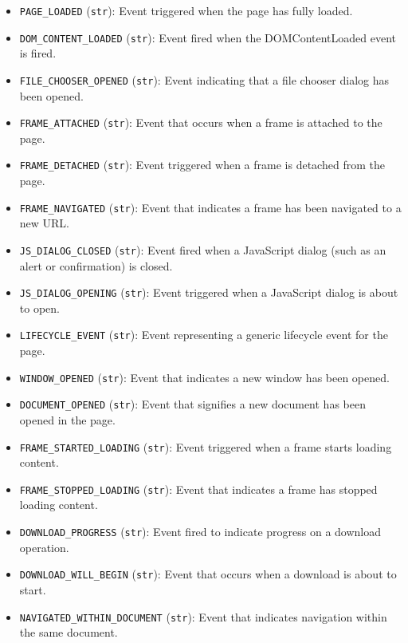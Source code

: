 \documentclass{article}
\begin{document}
\begin{itemize}
    \item \texttt{PAGE\_LOADED} (\texttt{str}): Event triggered when the page has fully loaded.
    \item \texttt{DOM\_CONTENT\_LOADED} (\texttt{str}): Event fired when the DOMContentLoaded event is fired.
    \item \texttt{FILE\_CHOOSER\_OPENED} (\texttt{str}): Event indicating that a file chooser dialog has been opened.
    \item \texttt{FRAME\_ATTACHED} (\texttt{str}): Event that occurs when a frame is attached to the page.
    \item \texttt{FRAME\_DETACHED} (\texttt{str}): Event triggered when a frame is detached from the page.
    \item \texttt{FRAME\_NAVIGATED} (\texttt{str}): Event that indicates a frame has been navigated to a new URL.
    \item \texttt{JS\_DIALOG\_CLOSED} (\texttt{str}): Event fired when a JavaScript dialog (such as an alert or confirmation) is closed.
    \item \texttt{JS\_DIALOG\_OPENING} (\texttt{str}): Event triggered when a JavaScript dialog is about to open.
    \item \texttt{LIFECYCLE\_EVENT} (\texttt{str}): Event representing a generic lifecycle event for the page.
    \item \texttt{WINDOW\_OPENED} (\texttt{str}): Event that indicates a new window has been opened.
    \item \texttt{DOCUMENT\_OPENED} (\texttt{str}): Event that signifies a new document has been opened in the page.
    \item \texttt{FRAME\_STARTED\_LOADING} (\texttt{str}): Event triggered when a frame starts loading content.
    \item \texttt{FRAME\_STOPPED\_LOADING} (\texttt{str}): Event that indicates a frame has stopped loading content.
    \item \texttt{DOWNLOAD\_PROGRESS} (\texttt{str}): Event fired to indicate progress on a download operation.
    \item \texttt{DOWNLOAD\_WILL\_BEGIN} (\texttt{str}): Event that occurs when a download is about to start.
    \item \texttt{NAVIGATED\_WITHIN\_DOCUMENT} (\texttt{str}): Event that indicates navigation within the same document.
\end{itemize}

\hrulefill
\end{document}
